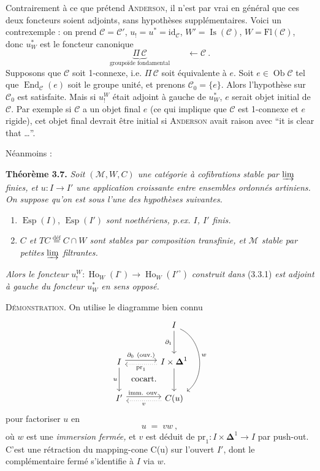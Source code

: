 \documentclass[11pt]{article}
\newcommand{\printedpage}[1]{\marginpar{\footnotesize p.~#1\ifstrequal{#1}{1}{\\[2pt]{[page 1]}}{}}}
\newcommand{\msp}[1]{\ifstrequal{#1}{page 1}{}{\marginpar{\footnotesize [#1]}}}
\newcommand{\Fl}{\mathrm{Fl}}
\newcommand{\M}{\mathcal{M}}
\newcommand{\Esp}{\operatorname{Esp}}
\newcommand{\Ob}{\operatorname{Ob}}
\newcommand{\Ho}{\operatorname{Ho}}
\newcommand{\id}{\mathrm{id}}
\newcommand{\pr}{\mathrm{pr}}
\begin{document}
\msp{page 59}
Contrairement à ce que prétend \textsc{Anderson}, il n'est par vrai en général que ces deux %
foncteurs soient adjoints, sans hypothèses supplémentaires. Voici un contrexemple : on prend $\mathcal{C} = \mathcal{C}'$, $u_! = u^* = \id_{\mathcal{C}}$, $W' = \operatorname{Is}(\mathcal{C})$, $W = \Fl(\mathcal{C})$, donc $u_W^*$ est le foncteur canonique
\[
\underbrace{\Pi\,\mathcal{C}}_{\text{groupoïde fondamental}} \qquad \longleftarrow \mathcal{C}\ .
\]
Supposons que $\mathcal{C}$ soit 1-connexe, i.e. $\Pi\,\mathcal{C}$ soit équivalente à $e$. Soit $e\in\Ob\mathcal{C}$ tel que $\operatorname{End}_{\mathcal{C}}(e)$ soit le groupe unité, et prenons $\mathcal{C}_0 = \{e\}$. Alors l'hypothèse sur $\mathcal{C}_0$ est satisfaite. Mais si $u_!^W$ était adjoint à gauche de $u_W^*$, $e$ serait objet initial de $\mathcal{C}$. Par exemple si $\mathcal{C}$ a un objet final $e$ (ce qui implique que $\mathcal{C}$ est 1-connexe et $e$ rigide), cet objet final devrait être initial si \textsc{Anderson} avait raison avec “it is clear that \ldots”.

\msp{page 60}
Néanmoins :

\textbf{Théorème 3.7.} \textit{Soit $(\M,W,C)$ une catégorie à cofibrations stable par $\varinjlim$ finies, et $u : I \longrightarrow I'$ une application croissante entre ensembles ordonnés artiniens. On suppose qu'on est sous l'une des hypothèses suivantes.}
\begin{enumerate}
\item[a)] $\Esp(I)$, $\Esp(I')$ \textit{sont noethériens, p.ex. $I$, $I'$ finis.}

\printedpage{30}
\item[b)] \textit{$C$ et $TC \overset{\text{déf}}{=} C\cap W$ sont stables par composition transfinie, et $\M$ stable par petites $\varinjlim$ filtrantes.}
\end{enumerate}
\textit{Alors le foncteur} $u_!^W : \Ho_W(I^\circ) \longrightarrow \Ho_W(I'^\circ)$ \textit{construit dans} (3.3.1) \textit{est adjoint à gauche du foncteur $u_W^*$ en sens opposé.}

\textsc{Démonstration.} On utilise le diagramme bien connu
\[
\begin{tikzcd}[row sep=large, column sep=large]
 & I \arrow[d, "\partial_1"'] \arrow[dd, bend left=60, "w"] \\
I \arrow[r, shift left, "\partial_0\ (\text{ouv.})"] \arrow[d, "u"'] \arrow[dr, phantom, "\text{cocart.}"] & I\times\boldsymbol{\Delta}^1 \arrow[l, dotted, shift left, "\pr_1"] \arrow[d] \\
I' \arrow[r, shift left, "\text{imm. ouv.}"] & C(u) \arrow[l, dotted, shift left, "v"]
\end{tikzcd}
\]
pour factoriser $u$ en
\[
u \;=\; vw\ ,
\]
où $w$ est une \textit{immersion fermée,} et $v$ est déduit de $\pr_1 : I\times\boldsymbol{\Delta}^1 \longrightarrow I$ par push-out. C'est une rétraction du mapping-cone C(u) sur l'ouvert $I'$, dont le complémentaire fermé s'identifie à $I$ via $w$.
\end{document}
